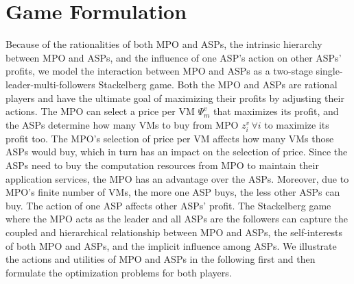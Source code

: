 \documentclass[conference]{IEEEtran}
\begin{document}
\section{Game Formulation}
Because of the rationalities of both MPO and ASPs, the intrinsic hierarchy between MPO and ASPs, and the influence of one ASP's action on other ASPs' profits, we model the interaction between MPO and ASPs as a two-stage single-leader-multi-followers Stackelberg game. Both the MPO and ASPs are rational players and have the ultimate goal of maximizing their profits by adjusting their actions. The MPO can select a price per VM $\Psi_{m}^v$ that maximizes its profit, and the ASPs determine how many VMs to buy from MPO $z_i^v \, \forall i$ to maximize its profit too. The MPO's selection of price per VM affects how many VMs those ASPs would buy, which in turn has an impact on the selection of price. Since the ASPs need to buy the computation resources from MPO to maintain their application services, the MPO has an advantage over the ASPs. Moreover, due to MPO's finite number of VMs, the more one ASP buys, the less other ASPs can buy. The action of one ASP affects other ASPs' profit. The Stackelberg game where the MPO acts as the leader and all ASPs are the followers can capture the coupled and hierarchical relationship between MPO and ASPs, the self-interests of both MPO and ASPs, and the implicit influence among ASPs. We illustrate the actions and utilities of MPO and ASPs in the following first and then formulate the optimization problems for both players.
\end{document}
